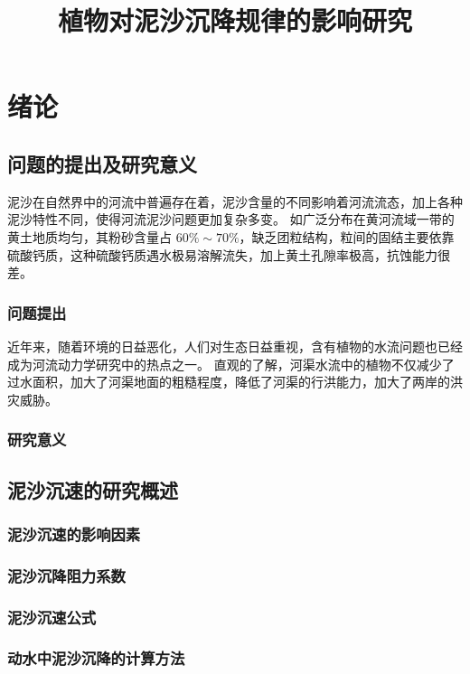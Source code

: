 \documentclass{HHUBachelorThesis}
\title{植物对泥沙沉降规律的影响研究}
\begin{document}
\ChineseCover
\EnglishCover
\AcademicStatement
\AbstractzhPage
\AbstractenPage
\ToCPage

\section{绪论}

\subsection{问题的提出及研究意义}

泥沙在自然界中的河流中普遍存在着，泥沙含量的不同影响着河流流态，加上各种泥沙特性不同，使得河流泥沙问题更加复杂多变。\cite{钱宁1983} 如广泛分布在黄河流域一带的黄土地质均匀，其粉砂含量占 $60\%\sim70\%$，缺乏团粒结构，粒间的固结主要依靠硫酸钙质，这种硫酸钙质遇水极易溶解流失，加上黄土孔隙率极高，抗蚀能力很差。

\subsubsection{问题提出}

近年来，随着环境的日益恶化，人们对生态日益重视，含有植物的水流问题也已经成为河流动力学研究中的热点之一。\cite{唐洪武2007} 直观的了解，河渠水流中的植物不仅减少了过水面积，加大了河渠地面的粗糙程度，降低了河渠的行洪能力，加大了两岸的洪灾威胁。\cite{kouwen1969,Gourlay1970}

\subsubsection{研究意义}
\subsection{泥沙沉速的研究概述}
\subsubsection{泥沙沉速的影响因素}
\subsubsection{泥沙沉降阻力系数}
\subsubsection{泥沙沉速公式}
\subsubsection{动水中泥沙沉降的计算方法}
\end{document}
